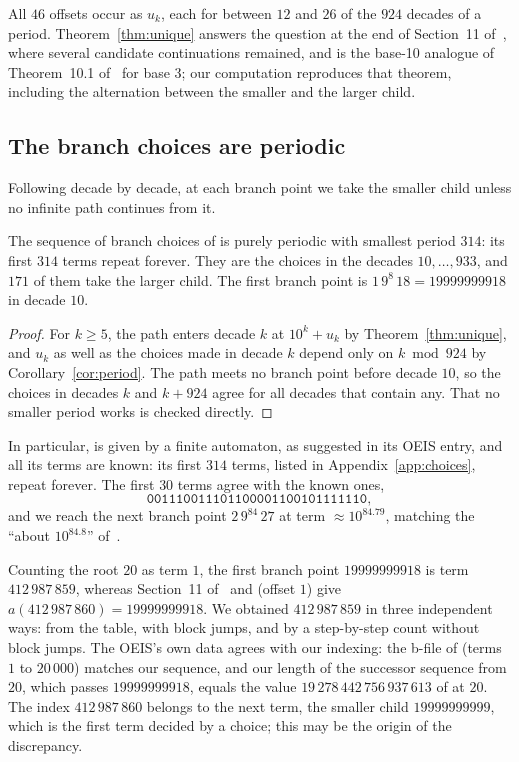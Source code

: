 All $46$ offsets occur as $u_k$, each for between $12$ and $26$ of the $924$ decades of a period.
Theorem~\ref{thm:unique} answers the question at the end of Section~11 of~\cite{comma}, where
several candidate continuations remained, and is the base-10 analogue of Theorem~10.1
of~\cite{comma} for base 3; our computation reproduces that theorem, including the alternation
between the smaller and the larger child.

\subsection{The branch choices are periodic}

Following  decade by decade, at each branch point we take the smaller child unless no
infinite path continues from it.

\begin{theorem}
  \label{thm:periodic}
  The sequence  of branch choices of  is purely periodic with smallest
  period $314$: its first $314$ terms repeat forever. They are the choices in the decades
  $10, \dots, 933$, and $171$ of them take the larger child. The first branch point is
  $1\,9^8\,18 = 19999999918$ in decade $10$.
\end{theorem}

\begin{proof}
  For $k \ge 5$, the path enters decade $k$ at $10^k + u_k$ by Theorem~\ref{thm:unique}, and $u_k$
  as well as the choices made in decade $k$ depend only on $k \bmod 924$ by
  Corollary~\ref{cor:period}. The path meets no branch point before decade $10$, so the choices
  in decades $k$ and $k + 924$ agree for all decades that contain any. That no smaller period
  works is checked directly.
\end{proof}

In particular,  is given by a finite automaton, as suggested in its OEIS entry, and
all its terms are known: its first $314$ terms, listed in Appendix~\ref{app:choices}, repeat
forever. The first $30$ terms agree with the known ones,
\[
  \texttt{001110011101100001100101111110},
\]
and we reach the next branch point $2\,9^{84}\,27$ at term $\approx 10^{84.79}$, matching the
``about $10^{84.8}$'' of~\cite[\S11]{comma}.

\begin{remark}
  \label{rem:index}\sloppy
  Counting the root $20$ as term $1$, the first branch point $19999999918$ is term
  $412\,987\,859$, whereas Section~11 of~\cite{comma} and  (offset $1$) give
  $a(412\,987\,860) = 19999999918$. We obtained $412\,987\,859$ in three independent ways: from the
  table, with block jumps, and by a step-by-step count without block jumps. The OEIS's own data
  agrees with our indexing: the b-file of  (terms $1$ to $20\,000$) matches our
  sequence, and our length of the successor sequence from $20$, which passes $19999999918$, equals
  the value $19\,278\,442\,756\,937\,613$ of  at $20$. The index $412\,987\,860$
  belongs to the next term, the smaller child $19999999999$, which is the first term decided by a
  choice; this may be the origin of the discrepancy.
\end{remark}
